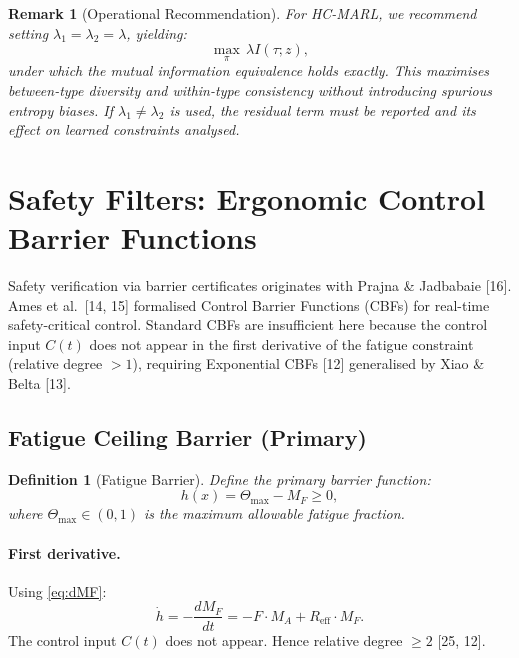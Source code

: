 \documentclass[11pt,a4paper]{article}
\newtheorem{definition}[theorem]{Definition}
\newtheorem{remark}[theorem]{Remark}
\begin{document}
\begin{remark}[Operational Recommendation]
For HC-MARL, we recommend setting $\lambda_1 = \lambda_2 = \lambda$,
yielding:
\begin{equation}\label{eq:mmicrl-mi}
\max_{\pi}\, \lambda I(\tau; z),
\end{equation}
under which the mutual information equivalence holds exactly. This
maximises between-type diversity and within-type consistency without
introducing spurious entropy biases. If $\lambda_1 \neq \lambda_2$ is
used, the residual term must be reported and its effect on learned
constraints analysed.
\end{remark}

\section{Safety Filters: Ergonomic Control Barrier Functions}\label{sec:ecbf}

Safety verification via barrier certificates originates with Prajna \&
Jadbabaie [16]. Ames et al.\ [14, 15] formalised Control Barrier
Functions (CBFs) for real-time safety-critical control. Standard CBFs
are insufficient here because the control input $C(t)$ does not appear
in the first derivative of the fatigue constraint (relative degree $>
1$), requiring Exponential CBFs [12] generalised by Xiao \& Belta
[13].

\subsection{Fatigue Ceiling Barrier (Primary)}

\begin{definition}[Fatigue Barrier]
Define the primary barrier function:
\begin{equation}\label{eq:h}
h(x) = \Theta_{\max} - M_F \geq 0,
\end{equation}
where $\Theta_{\max} \in (0, 1)$ is the maximum allowable fatigue
fraction.
\end{definition}

\paragraph{First derivative.} Using \eqref{eq:dMF}:
\begin{equation}\label{eq:hdot}
\dot h = -\frac{dM_F}{dt} = -F \cdot M_A + R_{\mathrm{eff}} \cdot M_F.
\end{equation}
The control input $C(t)$ does not appear. Hence relative degree $\geq 2$ [25, 12].
\end{document}
